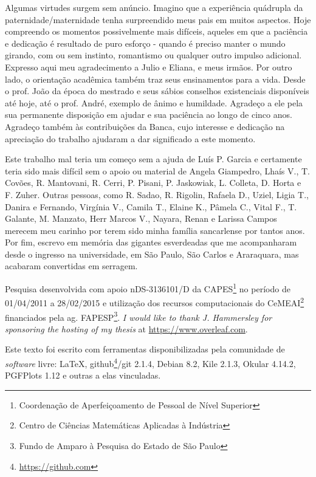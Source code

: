 Algumas virtudes surgem sem anúncio.
Imagino que a experiência quádrupla da paternidade/maternidade tenha surpreendido meus pais em muitos aspectos.
Hoje compreendo os momentos possivelmente mais difíceis, aqueles em que a paciência e dedicação é resultado de puro esforço - quando é preciso manter o mundo girando, com ou sem instinto, romantismo ou qualquer outro impulso adicional.
Expresso aqui meu agradecimento a Julio e Eliana, e meus irmãos.
Por outro lado, o orientação acadêmica também traz seus ensinamentos para a vida.
Desde o prof. João da época do mestrado e seus sábios conselhos existenciais disponíveis até hoje, até o prof. André, exemplo de ânimo e humildade.
Agradeço a ele pela sua permanente disposição em ajudar e sua paciência ao longo de cinco anos.
Agradeço também às contribuições da Banca, cujo interesse e dedicação na apreciação do trabalho ajudaram a dar significado a este momento.

Este trabalho mal teria um começo sem a ajuda de Luís P. Garcia e certamente teria sido mais difícil sem o apoio ou material de Angela Giampedro, Lhaís V., T. Covões, R. Mantovani, R. Cerri, P. Pisani, P. Jaskowiak, L. Colleta, D. Horta e F. Zuher.
Outras pessoas, como R. Sadao, R. Rigolin, Rafaela D., Uziel, Ligia T., Danira e Fernando, Virgínia V., Camila T., Elaine K., Pâmela C., Vital F., T. Galante, M. Manzato, Herr Marcos V., Nayara, Renan e Larissa Campos merecem meu carinho por terem sido minha família sancarlense por tantos anos.
Por fim, escrevo em memória das gigantes esverdeadas que me acompanharam desde o ingresso na universidade, em São Paulo, São Carlos e Araraquara, mas acabaram convertidas em serragem.

%
{\footnotesize
Pesquisa desenvolvida com apoio n\textordmasculine DS-3136101/D da CAPES\footnote{Coordenação de Aperfeiçoamento de Pessoal de Nível Superior} no período de 01/04/2011 a 28/02/2015 e utilização dos recursos computacionais do CeMEAI\footnote{Centro de Ciências Matemáticas Aplicadas à Indústria} financiados pela ag. FAPESP\footnote{Fundo de Amparo à Pesquisa do Estado de São Paulo}.
\textit{I would like to thank J. Hammersley for sponsoring the hosting of my thesis} at \url{https://www.overleaf.com}.

Este texto foi escrito com ferramentas disponibilizadas pela comunidade de \textit{software} livre:
\LaTeX, github\footnote{\url{https://github.com}}/git 2.1.4, Debian 8.2, Kile 2.1.3, Okular 4.14.2, PGFPlots 1.12 e outras a elas vinculadas.
}

